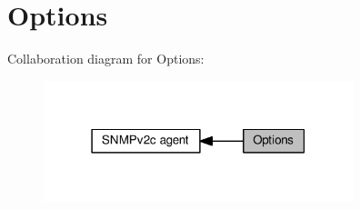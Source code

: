 \hypertarget{group__snmp__opts}{}\section{Options}
\label{group__snmp__opts}
Collaboration diagram for Options\+:
\nopagebreak
\begin{figure}[H]
\begin{center}
\leavevmode
\includegraphics[width=255pt]{group__snmp__opts}
\end{center}
\end{figure}
